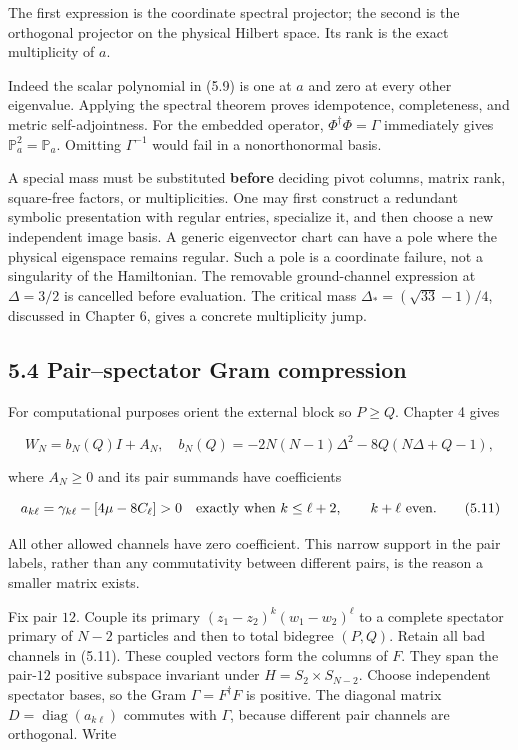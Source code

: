The first expression is the coordinate spectral projector; the second is the orthogonal projector on the physical Hilbert space. Its rank is the exact multiplicity of \(a\).

Indeed the scalar polynomial in (5.9) is one at \(a\) and zero at every other eigenvalue. Applying the spectral theorem proves idempotence, completeness, and metric self-adjointness. For the embedded operator, \(\Phi^\dagger\Phi=\Gamma\) immediately gives \(\mathbb P_a^2=\mathbb P_a\). Omitting \(\Gamma^{-1}\) would fail in a nonorthonormal basis.

A special mass must be substituted \textbf{before} deciding pivot columns, matrix rank, square-free factors, or multiplicities. One may first construct a redundant symbolic presentation with regular entries, specialize it, and then choose a new independent image basis. A generic eigenvector chart can have a pole where the physical eigenspace remains regular. Such a pole is a coordinate failure, not a singularity of the Hamiltonian. The removable ground-channel expression at \(\Delta=3/2\) is cancelled before evaluation. The critical mass \(\Delta_*=(\sqrt{33}-1)/4\), discussed in Chapter 6, gives a concrete multiplicity jump.

\hypertarget{pairspectator-gram-compression}{%
\subsection{5.4 Pair--spectator Gram compression}\label{pairspectator-gram-compression}}

For computational purposes orient the external block so \(P\ge Q\). Chapter 4 gives

\[
W_N=b_N(Q)I+A_N,\quad
b_N(Q)=-2N(N-1)\Delta^2-8Q(N\Delta+Q-1),
\tag{5.10}
\]

where \(A_N\ge0\) and its pair summands have coefficients

\[
a_{k\ell}=\gamma_{k\ell}-[4\mu-8C_\ell]>0
\quad\hbox{exactly when }k\le\ell+2,
\qquad k+\ell\text{ even}.
\tag{5.11}
\]

All other allowed channels have zero coefficient. This narrow support in the pair labels, rather than any commutativity between different pairs, is the reason a smaller matrix exists.

Fix pair \(12\). Couple its primary \((z_1-z_2)^k(w_1-w_2)^\ell\) to a complete spectator primary of \(N-2\) particles and then to total bidegree \((P,Q)\). Retain all bad channels in (5.11). These coupled vectors form the columns of \(F\). They span the pair-\(12\) positive subspace invariant under \(H=S_2\times S_{N-2}\). Choose independent spectator bases, so the Gram \(\Gamma=F^\dagger F\) is positive. The diagonal matrix \(D=\operatorname{diag}(a_{k\ell})\) commutes with \(\Gamma\), because different pair channels are orthogonal. Write

